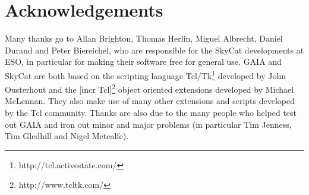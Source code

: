 \documentclass[twoside,11pt]{article}
\newcommand{\htmladdnormallinkfoot}[2]{#1\footnote{#2}}
\newcommand{\htmladdnormallink}[2]{#1}
\newcommand{\xlabel}[1]{}
\renewcommand{\_}{\texttt{\symbol{95}}}
\begin{document}
\section{\xlabel{acknowledgements}Acknowledgements}

Many thanks go to Allan Brighton, Thomas Herlin, Miguel Albrecht,
Daniel Durand and Peter Biereichel, who are responsible for the
\htmladdnormallink{SkyCat}{http://archive.eso.org/skycat/}
developments at ESO, in particular for making their software free for
general use.
GAIA and SkyCat are both based on the scripting language
\htmladdnormallinkfoot{Tcl/Tk}{http://tcl.activestate.com/} developed by
John Ousterhout and the \htmladdnormallinkfoot{[incr Tcl]}
{http://www.tcltk.com/} object oriented extensions developed by
Michael McLennan.
They also make use of many other extensions and scripts developed by
the Tcl community.
Thanks are also due to the many people who helped test out GAIA and
iron out minor and major problems (in particular Tim Jenness, Tim
Gledhill and Nigel Metcalfe).

\end{document}
